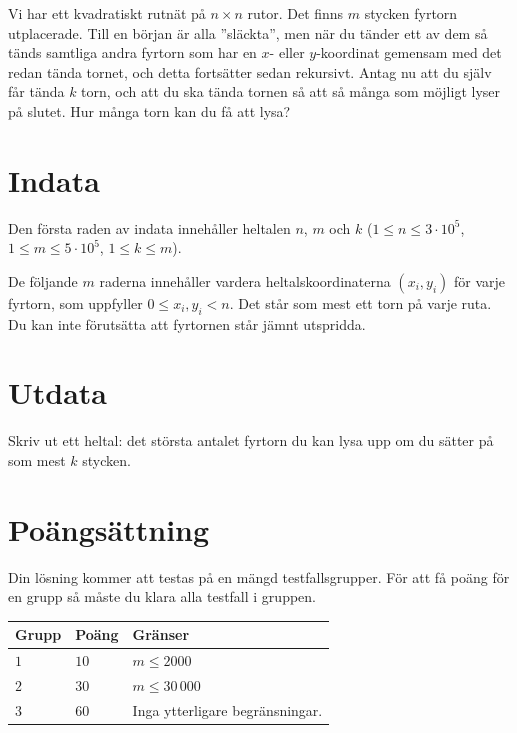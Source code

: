 

Vi har ett kvadratiskt rutnät på $n \times n$ rutor. Det finns $m$ stycken fyrtorn utplacerade.
Till en början är alla ''släckta'', men när du tänder ett av dem så tänds samtliga andra fyrtorn
som har en $x$- eller $y$-koordinat gemensam med det redan tända tornet, och detta fortsätter
sedan rekursivt. Antag nu att du själv får tända $k$ torn, och att du ska tända tornen så att så
många som möjligt lyser på slutet. Hur många torn kan du få att lysa?

\section*{Indata}
Den första raden av indata innehåller heltalen $n$, $m$ och $k$ ($1 \leq n \leq 3 \cdot 10^5$, $1 \leq m \leq 5 \cdot 10^5$, $1 \leq k \leq m$).

De följande $m$ raderna innehåller vardera heltalskoordinaterna $(x_i, y_i)$ för varje fyrtorn, som uppfyller $0 \le x_i, y_i < n$.
Det står som mest ett torn på varje ruta. Du kan inte förutsätta att fyrtornen står jämnt utspridda.

\section*{Utdata}
Skriv ut ett heltal: det största antalet fyrtorn du kan lysa upp om du sätter på som mest $k$ stycken.


\section*{Poängsättning}
Din lösning kommer att testas på en mängd testfallsgrupper.
För att få poäng för en grupp så måste du klara alla testfall i gruppen.

\noindent
\begin{tabular}{| l | l | p{12cm} |}
  \hline
  \textbf{Grupp} & \textbf{Poäng} & \textbf{Gränser} \\ \hline
  $1$   & $10$        & $m \leq 2000$ \\ \hline
  $2$   & $30$        & $m \leq 30\,000$ \\ \hline
  $3$   & $60$        & Inga ytterligare begränsningar. \\ \hline
\end{tabular}

